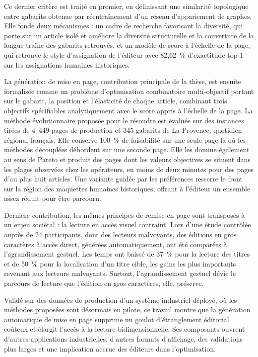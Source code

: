 \begin{ResumeMotsCles}
\begin{resume}
Ce dernier critère est traité en premier, en définissant une similarité topologique entre gabarits obtenue par réentraînement d'un réseau d'appariement de graphes. Elle fonde deux mécanismes : un cadre de recherche favorisant la diversité, qui porte sur un article isolé et améliore la diversité structurelle et la couverture de la longue traîne des gabarits retrouvés, et un modèle de score à l'échelle de la page, qui retrouve le style d'assignation de l'éditeur avec 82,62~\% d'exactitude top-1 sur les assignations humaines historiques.

La génération de mise en page, contribution principale de la thèse, est ensuite formalisée comme un problème d'optimisation combinatoire multi-objectif portant sur le gabarit, la position et l'élasticité de chaque article, combinant trois objectifs spécifiables analytiquement avec le score appris à l'échelle de la page. La méthode évolutionnaire proposée pour le résoudre est évaluée sur des instances tirées de 4~449 pages de production et 345 gabarits de La Provence, quotidien régional français. Elle conserve 100~\% de faisabilité sur une seule page là où les méthodes découplées débordent sur une seconde page. Elle les domine également au sens de Pareto et produit des pages dont les valeurs objectives se situent dans les plages observées chez les opérateurs, en moins de deux minutes pour des pages d'au plus huit articles. Une variante guidée par les préférences resserre le front sur la région des maquettes humaines historiques, offrant à l'éditeur un ensemble assez réduit pour être parcouru.

Dernière contribution, les mêmes principes de remise en page sont transposés à un enjeu sociétal : la lecture en accès visuel contraint. Lors d'une étude contrôlée auprès de 24 participants, dont des lecteurs malvoyants, des éditions en gros caractères à accès direct, générées automatiquement, ont été comparées à l'agrandissement gestuel. Les temps ont baissé de 37~\% pour la lecture des titres et de 50~\% pour la localisation d'un titre cible, les gains les plus importants revenant aux lecteurs malvoyants. Surtout, l'agrandissement gestuel dévie le parcours de lecture que l'édition en gros caractères, elle, préserve.

Validé sur des données de production d'un système industriel déployé, où les méthodes proposées sont désormais en pilote, ce travail montre que la génération automatique de mise en page supprime un goulot d'étranglement éditorial coûteux et élargit l'accès à la lecture bidimensionnelle. Ses composants ouvrent d'autres applications industrielles, d'autres formats d'affichage, des validations plus larges et une implication accrue des éditeurs dans l'optimisation.
\end{resume}


\end{ResumeMotsCles}
